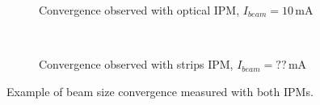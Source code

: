 \begin{figure}[!ht]
  \begin{subfigure}[t]{0.5\textwidth}
    
    \caption{Convergence observed with optical IPM, $I_{beam} = 10\,\mathrm{mA}$}
    \label{chap4:fig:fig000_HT_size_a}
  \end{subfigure}
  ~
  \begin{subfigure}[t]{0.5\textwidth}
    
    \caption{Convergence observed with strips IPM, $I_{beam} = ??\,\mathrm{mA}$}
    \label{chap4:fig:fig000_HT_size_b}
  \end{subfigure}
  \caption[Example of beam size convergence measured with both IPMs]{Example of beam size convergence measured with both IPMs.}
  \label{chap4:fig:fig000_HT_size}
\end{figure}
